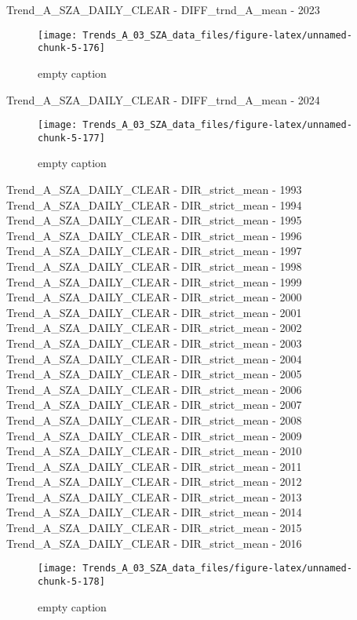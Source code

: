 \documentclass[
  10pt,
  a4paper,oneside]{article}
\begin{document}
Trend\_A\_SZA\_DAILY\_CLEAR - DIFF\_trnd\_A\_mean - 2023

\begin{figure}[!ht]

{\centering \texttt{[image: Trends\_A\_03\_SZA\_data\_files/figure-latex/unnamed-chunk-5-176]} 

}

\caption{ empty caption }\label{fig:unnamed-chunk-5-176}
\end{figure}

Trend\_A\_SZA\_DAILY\_CLEAR - DIFF\_trnd\_A\_mean - 2024

\begin{figure}[!ht]

{\centering \texttt{[image: Trends\_A\_03\_SZA\_data\_files/figure-latex/unnamed-chunk-5-177]} 

}

\caption{ empty caption }\label{fig:unnamed-chunk-5-177}
\end{figure}

Trend\_A\_SZA\_DAILY\_CLEAR - DIR\_strict\_mean - 1993
Trend\_A\_SZA\_DAILY\_CLEAR - DIR\_strict\_mean - 1994
Trend\_A\_SZA\_DAILY\_CLEAR - DIR\_strict\_mean - 1995
Trend\_A\_SZA\_DAILY\_CLEAR - DIR\_strict\_mean - 1996
Trend\_A\_SZA\_DAILY\_CLEAR - DIR\_strict\_mean - 1997
Trend\_A\_SZA\_DAILY\_CLEAR - DIR\_strict\_mean - 1998
Trend\_A\_SZA\_DAILY\_CLEAR - DIR\_strict\_mean - 1999
Trend\_A\_SZA\_DAILY\_CLEAR - DIR\_strict\_mean - 2000
Trend\_A\_SZA\_DAILY\_CLEAR - DIR\_strict\_mean - 2001
Trend\_A\_SZA\_DAILY\_CLEAR - DIR\_strict\_mean - 2002
Trend\_A\_SZA\_DAILY\_CLEAR - DIR\_strict\_mean - 2003
Trend\_A\_SZA\_DAILY\_CLEAR - DIR\_strict\_mean - 2004
Trend\_A\_SZA\_DAILY\_CLEAR - DIR\_strict\_mean - 2005
Trend\_A\_SZA\_DAILY\_CLEAR - DIR\_strict\_mean - 2006
Trend\_A\_SZA\_DAILY\_CLEAR - DIR\_strict\_mean - 2007
Trend\_A\_SZA\_DAILY\_CLEAR - DIR\_strict\_mean - 2008
Trend\_A\_SZA\_DAILY\_CLEAR - DIR\_strict\_mean - 2009
Trend\_A\_SZA\_DAILY\_CLEAR - DIR\_strict\_mean - 2010
Trend\_A\_SZA\_DAILY\_CLEAR - DIR\_strict\_mean - 2011
Trend\_A\_SZA\_DAILY\_CLEAR - DIR\_strict\_mean - 2012
Trend\_A\_SZA\_DAILY\_CLEAR - DIR\_strict\_mean - 2013
Trend\_A\_SZA\_DAILY\_CLEAR - DIR\_strict\_mean - 2014
Trend\_A\_SZA\_DAILY\_CLEAR - DIR\_strict\_mean - 2015
Trend\_A\_SZA\_DAILY\_CLEAR - DIR\_strict\_mean - 2016

\begin{figure}[!ht]

{\centering \texttt{[image: Trends\_A\_03\_SZA\_data\_files/figure-latex/unnamed-chunk-5-178]} 

}

\caption{ empty caption }\label{fig:unnamed-chunk-5-178}
\end{figure}
\end{document}
